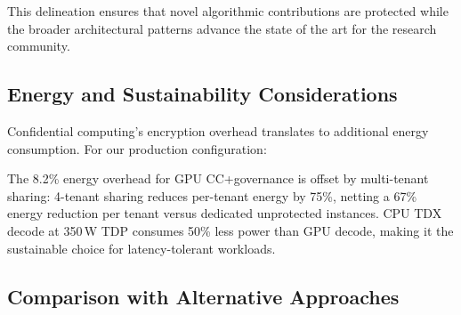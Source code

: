 \documentclass[conference,10pt]{IEEEtran}
\begin{document}
This delineation ensures that novel algorithmic contributions are protected while the broader architectural patterns advance the state of the art for the research community.

\subsection{Energy and Sustainability Considerations}

Confidential computing's encryption overhead translates to additional energy consumption. For our production configuration:

\begin{table}[!htbp]
\caption{Energy Impact of Confidential Governed Inference}
\label{tab:energy}
\centering\scriptsize
{}
\end{table}

The 8.2\% energy overhead for GPU CC+governance is offset by multi-tenant sharing: 4-tenant sharing reduces per-tenant energy by 75\%, netting a 67\% energy reduction per tenant versus dedicated unprotected instances. CPU TDX decode at 350\,W TDP consumes 50\% less power than GPU decode, making it the sustainable choice for latency-tolerant workloads.

\subsection{Comparison with Alternative Approaches}
\end{document}
